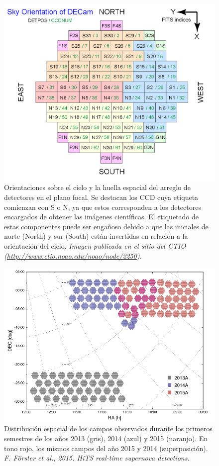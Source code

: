\begin{figure}[h!]
\centering
\includegraphics[scale=.75]{images/decam}
\caption{Orientaciones sobre el cielo y la huella espacial del arreglo de detectores en el plano focal. Se destacan los CCD cuya etiqueta comienzan con S o N, ya que estos corresponden a los detectores encargados de obtener las im\'agenes cient\'ificas. El etiquetado de estas componentes puede ser enga\~noso debido a que las iniciales de norte (North) y sur (South) est\'an invertidas en relaci\'on a la orientaci\'on del cielo. \textit{Imagen publicada en el sitio del CTIO (\url{http://www.ctio.noao.edu/noao/node/2250})}.}
\label{fig:f4}
\end{figure}

\begin{figure}
\centering
\includegraphics[scale=.5]{images/fields}
\caption{Distribuci\'on espacial de los campos observados durante los primeros semestres de los a\~nos 2013 (gris), 2014 (azul) y 2015 (naranjo). En tono rojo, los mismos campos del a\~no 2015 y 2014 (superposici\'on). \textit{F. F\"orster et al., 2015. HiTS real-time supernova detections.}}
\label{fig:fields}
\end{figure}

